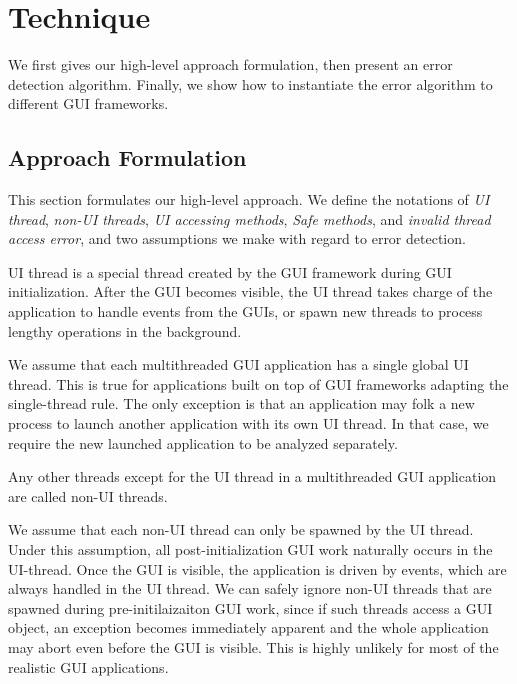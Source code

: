 \section{Technique}
\label{sec:technique}

We first gives our high-level approach formulation, then present
an error detection algorithm. Finally, we show how to instantiate
the error algorithm to different GUI frameworks.


\subsection{Approach Formulation}

This section formulates our high-level approach. We define the
notations of \textit{UI thread}, \textit{non-UI threads},
\textit{UI accessing methods},
 \textit{Safe methods}, and \textit{invalid thread access error}, and
two assumptions we make with regard to error detection.

 {UI thread
is a special thread created by the GUI framework during
GUI initialization. After the GUI becomes visible, the UI thread
takes charge of the application to handle events from the GUIs,
or spawn new threads to process lengthy operations in the background. }\vspace{1mm}

 {We assume that each multithreaded
GUI application has a single global UI thread. This is true for applications
built on top of GUI frameworks adapting the single-thread rule. The
only exception is that 
 an application may folk a new process to launch another
application with its own UI thread. In that case, we require the new
launched application to be analyzed separately.}\vspace{1mm}

 {Any other
threads except for the UI thread in a multithreaded GUI application
 are called non-UI threads.}\vspace{1mm}

 { We assume that each non-UI
thread can only be spawned by the UI thread. Under this assumption,
 all post-initialization
GUI work naturally occurs in the UI-thread. Once the GUI is visible, the
application is driven by events, which are always handled in the UI thread.
We can safely ignore non-UI threads that are spawned during pre-initilaizaiton
GUI work, since if such threads access a GUI object, an exception becomes
immediately apparent and the whole application may abort even before the
GUI is visible. This is highly unlikely for most of the realistic GUI
applications.
}\vspace{1mm}

